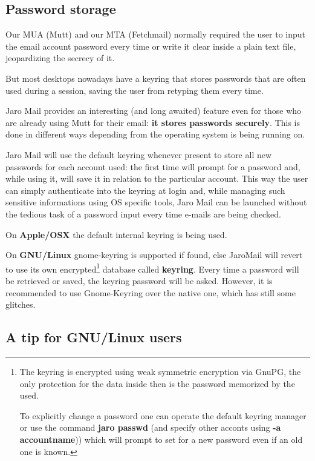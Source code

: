 \documentclass[a4,onecolumn,portrait]{article}
\begin{document}
\subsection{Password storage}
\label{sec-9-1}

Our MUA (Mutt) and our MTA (Fetchmail) normally required the user to input the email account password every time or write it clear inside a plain text file, jeopardizing the secrecy of it.

But most desktops nowadays have a keyring that stores passwords that are often used during a session, saving the user from retyping them every time.

Jaro Mail provides an interesting (and long awaited) feature even for those who are already using Mutt for their email: \textbf{it stores passwords securely}. This is done in different ways depending from the operating system is being running on.

Jaro Mail will use the default keyring whenever present to store all new passwords for each account used: the first time will prompt for a password and, while using it, will save it in relation to the particular account. This way the user can simply authenticate into the keyring at login and, while managing such sensitive informations using OS specific tools, Jaro Mail can be launched without the tedious task of a password input every time e-mails are being checked.

On \textbf{Apple/OSX} the default internal keyring is being used.

On \textbf{GNU/Linux} gnome-keyring is supported if found, else JaroMail will revert to use its own encrypted\footnote{The keyring is encrypted using weak symmetric
encryption via GnuPG, the only protection for the data inside then is
the password memorized by the used.

To explicitly change a password one can operate the default keyring manager or use the command \textbf{jaro passwd} (and specify other acconts using \textbf{-a accountname})) which will prompt to set for a new password even if an old one is known.} database called \textbf{keyring}. Every time a password will be retrieved or saved, the keyring password will be asked. However, it is recommended to use Gnome-Keyring over the native one, which has still some glitches.
\subsection{A tip for GNU/Linux users}
\label{sec-9-2}
\end{document}
